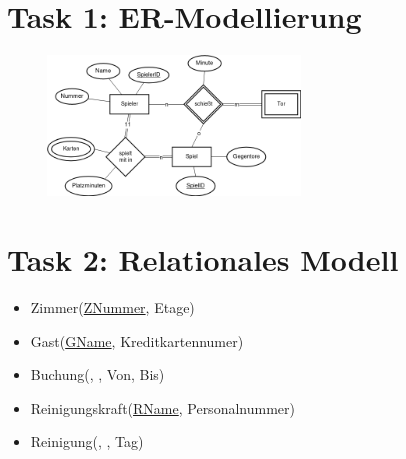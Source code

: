 
\newcommand{\dozent}{Prof. Dr. Agnès Voisard \\ Nicolas Lehmann}					%
\newcommand{\tutor}{Toni Draßdo}						%
\newcommand{\tutoriumNo}{03}				%
\newcommand{\ubungNo}{014}									%
\newcommand{\veranstaltung}{Datenbanksysteme}	%
\newcommand{\semester}{SoSe 18}						%
\newcommand{\studenten}{Eduard Beiline, Mark Niehues, Antoen Oehler}			%

\usepackage[normalem]{ulem}





\section*{Task 1: ER-Modellierung}
\begin{figure}[htbp]
  \centering
  \includegraphics[width=0.6\textwidth]{1.png}
\end{figure}

\section*{Task 2: Relationales Modell}
\begin{itemize}
  \item Zimmer(\underline{ZNummer}, Etage)
  \item Gast(\underline{GName}, Kreditkartennumer)
  \item Buchung(, , Von, Bis)
  \item Reinigungskraft(\underline{RName}, Personalnummer)
  \item Reinigung(, , Tag)
\end{itemize}
\pagebreak

